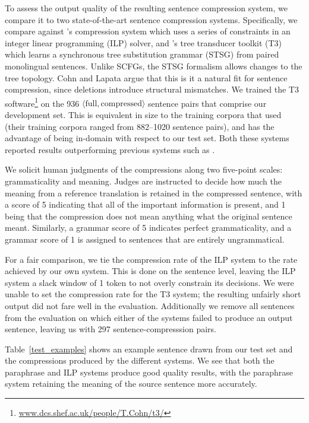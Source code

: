 \documentclass[11pt]{article}
\begin{document}
To assess the output quality of the resulting sentence compression
system, we compare it to two state-of-the-art sentence compression
systems.  Specifically, we compare against 's
compression system which uses a series of constraints in an integer
linear programming (ILP) solver, and 's tree
transducer toolkit (T3) which learns a synchronous tree substitution
grammar (STSG) from paired monolingual sentences.  Unlike SCFGs, the
STSG formalism allows changes to the tree topology. Cohn and Lapata
argue that this is it a natural fit for sentence compression, since
deletions introduce structural mismatches.  We trained the T3
software\footnote{\url{www.dcs.shef.ac.uk/people/T.Cohn/t3/}} on the
936 $\langle\text{full}, \text{compressed}\rangle$ sentence pairs that
comprise our development set.  This is equivalent in size to the
training corpora that  used (their training corpora
ranged from 882--1020 sentence pairs), and has the advantage of being
in-domain with respect to our test set.  Both these systems reported
results outperforming previous systems such as .

We solicit human judgments of the compressions along two five-point
scales: grammaticality and meaning. Judges are instructed to decide
how much the meaning from a reference translation is retained in the
compressed sentence, with a score of 5 indicating that all of the
important information is present, and 1 being that the compression
does not mean anything what the original sentence meant. Similarly, a
grammar score of 5 indicates perfect grammaticality, and a grammar
score of 1 is assigned to sentences that are entirely ungrammatical.

For a fair comparison, we tie the compression rate of the ILP system
to the rate achieved by our own system. This is done on the sentence
level, leaving the ILP system a slack window of 1 token to not overly
constrain its decisions. We were unable to set the compression rate
for the T3 system; the resulting unfairly short output did not fare
well in the evaluation.  Additionally we remove all sentences from the
evaluation on which either of the systems failed to produce an output
sentence, leaving us with 297 sentence-compresssion pairs.

Table~\ref{test_examples} shows an example sentence drawn from our
test set and the compressions produced by the different systems. We
see that both the paraphrase and ILP systems produce good quality
results, with the paraphrase system retaining the meaning of the
source sentence more accurately.
\end{document}
